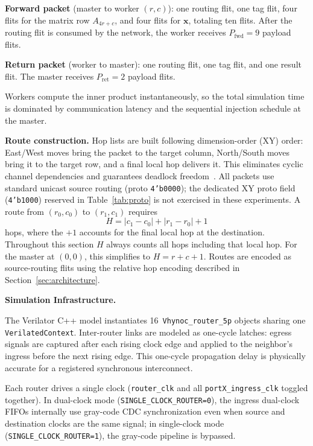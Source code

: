 \textbf{Forward packet} (master to worker $(r,c)$): one routing flit, one tag
flit, four flits for the matrix row $A_{4r+c}$, and four flits for
$\mathbf{x}$, totaling ten flits.  After the routing flit is consumed by the
network, the worker receives $P_\text{fwd}=9$ payload flits.

\textbf{Return packet} (worker to master): one routing flit, one tag flit, and one
result flit.  The master receives $P_\text{ret}=2$ payload flits.

Workers compute the inner product instantaneously, so the total simulation time
is dominated by communication latency and the sequential injection schedule at
the master.

\textbf{Route construction.}  Hop lists are built following dimension-order
(XY) order: East/West moves bring the packet to the target column, North/South
moves bring it to the target row, and a final local hop delivers it.  This
eliminates cyclic channel dependencies and guarantees deadlock
freedom~\cite{dally1987}.  All packets use standard unicast source routing
(proto \texttt{4'b0000}); the dedicated XY proto field (\texttt{4'b1000})
reserved in Table~\ref{tab:proto} is not exercised in these experiments.
A route from $(r_0,c_0)$ to $(r_1,c_1)$ requires
\begin{equation}
  H = |c_1-c_0| + |r_1-r_0| + 1
  \label{eq:hops-xy}
\end{equation}
hops, where the $+1$ accounts for the final local hop at the destination.
Throughout this section $H$ always counts all hops including that local hop.
For the master at $(0,0)$, this simplifies to $H=r+c+1$.  Routes are encoded as source-routing flits using the relative hop
encoding described in Section~\ref{sec:architecture}.

\textbf{Simulation Infrastructure.}

The Verilator C++ model instantiates 16~\texttt{Vhynoc\_router\_5p} objects
sharing one \texttt{VerilatedContext}.  Inter-router links are modeled as
one-cycle latches: egress signals are captured after each rising clock edge and
applied to the neighbor's ingress before the next rising edge.  This one-cycle
propagation delay is physically accurate for a registered synchronous
interconnect.

Each router drives a single clock (\texttt{router\_clk} and all
\texttt{portX\_ingress\_clk} toggled together).  In dual-clock mode
(\texttt{SINGLE\_CLOCK\_ROUTER=0}), the ingress dual-clock FIFOs internally
use gray-code CDC synchronization even when source and destination clocks are
the same signal; in single-clock mode (\texttt{SINGLE\_CLOCK\_ROUTER=1}), the
gray-code pipeline is bypassed.

